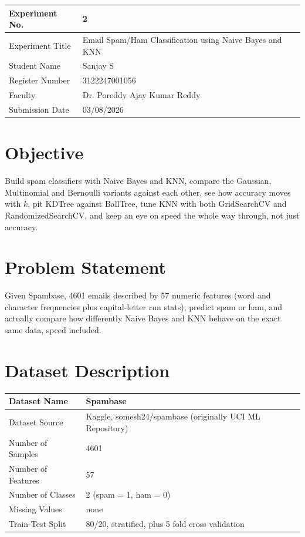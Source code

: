 \documentclass[12pt,a4paper]{article}
\begin{document}
\begin{tabular}{|p{4cm}|p{11cm}|}
\hline
Experiment No. & 2 \\ \hline
Experiment Title & Email Spam/Ham Classification using Naive Bayes and KNN\footnotemark \\ \hline
Student Name & Sanjay S \\ \hline
Register Number & 3122247001056 \\ \hline
Faculty & Dr. Poreddy Ajay Kumar Reddy \\ \hline
Submission Date & 03/08/2026 \\ \hline
\end{tabular}

\section{Objective}
Build spam classifiers with Naive Bayes and KNN, compare the Gaussian, Multinomial and Bernoulli
variants against each other, see how accuracy moves with $k$, pit KDTree against BallTree, tune KNN
with both GridSearchCV and RandomizedSearchCV, and keep an eye on speed the whole way through, not just
accuracy.

\section{Problem Statement}
Given Spambase, 4601 emails described by 57 numeric features (word and character frequencies plus
capital-letter run stats), predict spam or ham, and actually compare how differently Naive Bayes and
KNN behave on the exact same data, speed included.

\section{Dataset Description}
\begin{longtable}{|p{6cm}|p{8cm}|}
\hline
Dataset Name & Spambase \\ \hline
Dataset Source & Kaggle, somesh24/spambase (originally UCI ML Repository) \\ \hline
Number of Samples & 4601 \\ \hline
Number of Features & 57 \\ \hline
Number of Classes & 2 (spam = 1, ham = 0) \\ \hline
Missing Values & none \\ \hline
Train-Test Split & 80/20, stratified, plus 5 fold cross validation \\ \hline
\end{longtable}
\end{document}
